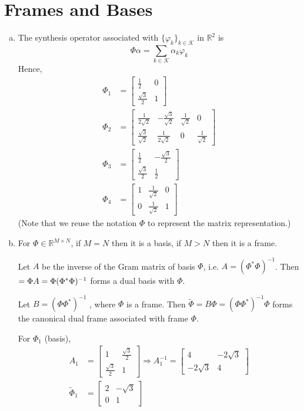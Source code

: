 \section{Frames and Bases}\label{sec:part1}

\begin{enumerate}[(a)]
\item The synthesis operator associated with $\{\varphi_k\}_{k \in \mathcal{K}}$ in $\mathbb{R}^2$ is
\[\Phi\alpha = \sum_{k \in \mathcal{K}} \alpha_k \varphi_k\]
Hence,
\begin{align*}
	\Phi_1 &= \begin{bmatrix}
	\frac{1}{2} & 0\\
	\frac{\sqrt{3}}{2} & 1
	\end{bmatrix} \\
	\Phi_2 &= \begin{bmatrix}
	\frac{1}{2\sqrt{2}} & -\frac{\sqrt{3}}{\sqrt{2}} & \frac{1}{\sqrt{2}} & 0\\
	\frac{\sqrt{3}}{\sqrt{2}} & \frac{1}{2\sqrt{2}} & 0 & \frac{1}{\sqrt{2}}
	\end{bmatrix} \\
	\Phi_3 &= \begin{bmatrix}
	\frac{1}{2} & -\frac{\sqrt{3}}{2} \\
	\frac{\sqrt{3}}{2} & \frac{1}{2}
	\end{bmatrix} \\
	\Phi_4 &= \begin{bmatrix}
	1 & \frac{1}{\sqrt{2}} & 0 \\
	0 & \frac{1}{\sqrt{2}} & 1
	\end{bmatrix}
\end{align*}
(Note that we reuse the notation $\Phi$ to represent the matrix representation.)

\item For $\Phi \in \mathbb{R}^{M \times N}$, if $M = N$ then it is a basis, if $M > N$ then it is a frame. 


Let $A$ be the inverse of the Gram matrix of basis $\Phi$, i.e. $A = (\Phi^* \Phi)^{-1}$. Then $\title{\Phi} = \Phi A = \Phi (\Phi^* \Phi)^{-1}$ forms a dual basis with $\Phi$.

Let $B = (\Phi \Phi^*)^{-1}$ , where $\Phi$ is a frame. Then $\tilde{\Phi} = B \Phi = (\Phi \Phi^*)^{-1} \Phi$ forms the canonical dual frame associated with frame $\Phi$.

For $\Phi_1$ (basis),
\begin{align*}
	A_1 &= \begin{bmatrix}
	1 & \frac{\sqrt{3}}{2} \\
	\frac{\sqrt{3}}{2} & 1
	\end{bmatrix} \Rightarrow A_1^{-1} = \begin{bmatrix}
	4 & -2\sqrt{3} \\
	-2\sqrt{3} & 4
	\end{bmatrix} \\
	\tilde{\Phi}_1 &= \begin{bmatrix}
	2 & -\sqrt{3} \\
	0 & 1
	\end{bmatrix}
\end{align*}


\end{enumerate}
